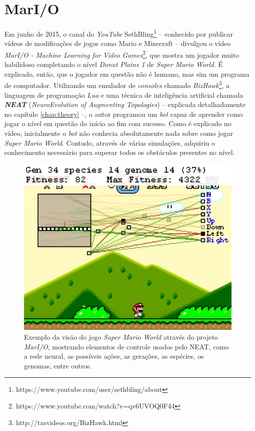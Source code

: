 \section{MarI/O}
Em junho de 2015, o canal do \textit{YouTube}
SethBling\footnote{https://www.youtube.com/user/sethbling/about} -- conhecido
por publicar vídeos de modificações de jogos como Mario e Minecraft -- divulgou
o vídeo \textit{MarI/O - Machine Learning for Video
Games}\footnote{https://www.youtube.com/watch?v=qv6UVOQ0F44}, que mostra um
jogador muito habilidoso completando o nível \textit{Donut Plains 1} de
\textit{Super Mario World}. É explicado, então, que o jogador em questão não é
humano, mas sim um programa de computador. Utilizando um emulador de
\textit{consoles} chamado
\textit{BizHawk}\footnote{http://tasvideos.org/BizHawk.html}, a linguagem de
programação \textit{Lua} e uma técnica de inteligência artificial chamada
\textit{\textbf{NEAT}} (\textit{NeuroEvolution of Augmenting Topologies})
\cite{stanley:ec02} -- explicada detalhadamente no capítulo \ref{chap:theory}
--, o autor programou um \textit{bot} capaz de aprender como jogar o nível em
questão do início ao fim com sucesso. Como é explicado no vídeo, inicialmente o
\textit{bot} não conhecia absolutamente nada sobre como jogar \textit{Super
Mario World}. Contudo, através de várias simulações, adquiriu o conhecimento
necessário para superar todos os obstáculos presentes no nível.

\begin{figure}[htb!]
\centering
\includegraphics[width=.65\textwidth]{fig/mar-io-example.png}
\caption{\label{fig:mar-io-example}Exemplo da visão do jogo \textit{Super
Mario World} através do projeto \textit{MarI/O}, mostrando elementos de
controle usados pelo NEAT, como a rede neural, as possíveis ações, as
gerações, as espécies, os genomas, entre outros.}
\end{figure}

